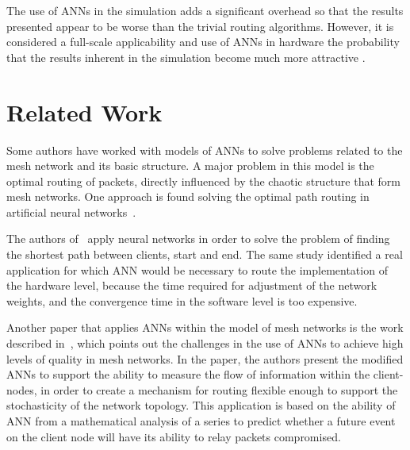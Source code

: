 \documentclass[10pt, conference, compsocconf]{IEEEtran}
\begin{document}
The use of ANNs in the simulation adds a significant overhead so that the results presented appear to be worse than the trivial routing algorithms. However, it is considered a full-scale applicability and use of ANNs in hardware the probability that the results inherent in the simulation become much more attractive \cite{Akyildiz:2006:NGS:1162469.1162470}.


\section{Related Work}

Some authors have worked with models of ANNs to solve problems related to the mesh network and its basic structure. A major problem in this model is the optimal routing of packets, directly influenced by the chaotic structure that form mesh networks. One approach is found solving the optimal path routing in artificial neural networks~\cite{Venkataram:2002:NNB:638963.638974}.


The authors of~\cite{Venkataram:2002:NNB:638963.638974} apply neural networks in order to solve the problem of finding the shortest path between clients, start and end. The same study identified a real application for which ANN would be necessary to route the implementation of the hardware level, because the time required for adjustment of the network weights, and the convergence time in the software level is too expensive.

Another paper that applies ANNs within the model of mesh networks is the work described in~\cite{Zhi:5364647}, which points out the challenges in the use of ANNs to achieve high levels of quality in mesh networks. In the paper, the authors present the modified ANNs to support the ability to measure the flow of information within the client-nodes, in order to create a mechanism for routing flexible enough to support the stochasticity of the network topology. This application is based on the ability of ANN from a mathematical analysis of a series to predict whether a future event on the client node will have its ability to relay packets compromised.
\end{document}
